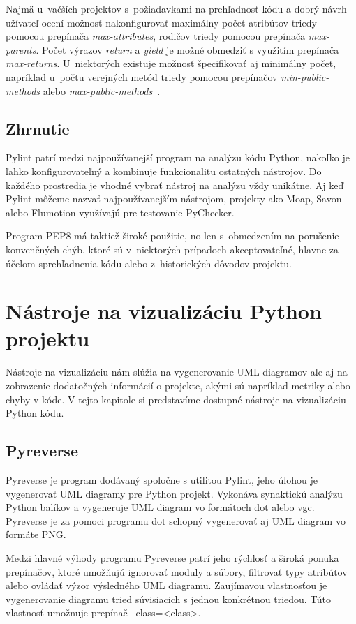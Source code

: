 \documentclass[11pt,oneside,final]{fithesis2}
\begin{document}
    Najmä u~vačších projektov s~požiadavkami na prehľadnosť kódu a dobrý návrh užívateľ ocení možnosť nakonfigurovať maximálny počet atribútov triedy pomocou prepínača \textit{max-attributes}, rodičov triedy pomocou prepínača \textit{max-parents}. Počet výrazov \textit{return} a \textit{yield} je možné obmedziť s využitím prepínača \textit{max-returns}. U~niektorých existuje možnosť špecifikovať aj minimálny počet, napríklad u~počtu verejných metód triedy pomocou prepínačov \textit{min-public-methods} alebo \textit{max-public-methods}~\cite{pylintfeatures}.
    
\subsection{Zhrnutie}
Pylint patrí medzi najpoužívanejší program na analýzu kódu Python, nakoľko je ľahko konfigurovateľný a kombinuje funkcionalitu ostatných nástrojov. Do každého prostredia je vhodné vybrať nástroj na analýzu vždy unikátne. Aj keď Pylint môžeme nazvať najpoužívanejším nástrojom, projekty ako Moap, Savon alebo Flumotion využívajú pre testovanie PyChecker.
    
    Program PEP8 má taktiež široké použitie, no len s~obmedzením na porušenie konvenčných chýb, ktoré  sú v~niektorých prípadoch akceptovateľné, hlavne za účelom sprehľadnenia kódu alebo z~historických dôvodov projektu.
    	
	
	\section{Nástroje na vizualizáciu Python projektu}
	
	Nástroje na vizualizáciu nám slúžia na vygenerovanie UML diagramov ale aj na zobrazenie dodatočných informácií o projekte, akými sú napríklad metriky alebo chyby v kóde. V tejto kapitole si predstavíme dostupné nástroje na vizualizáciu Python kódu.
	
	\subsection{Pyreverse}
		Pyreverse je program dodávaný spoločne s utilitou Pylint, jeho úlohou je vygenerovať UML diagramy pre Python projekt. Vykonáva synaktickú analýzu Python balíkov a vygeneruje UML diagram vo formátoch dot alebo vgc. Pyreverse je za pomoci programu dot schopný vygenerovať aj UML diagram vo formáte PNG.
		
		Medzi hlavné výhody programu Pyreverse patrí jeho rýchlosť a široká ponuka prepínačov, ktoré umožňujú ignorovať moduly a súbory, filtrovať typy atribútov alebo ovládať výzor výsledného UML diagramu.		
		Zaujímavou vlastnosťou je vygenerovanie diagramu tried súvisiacich s jednou konkrétnou triedou. Túto vlastnosť umožnuje prepínač --class=<class>.
		
\end{document}
